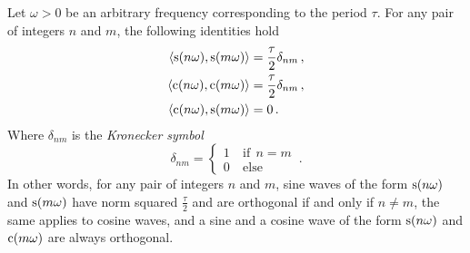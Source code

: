 \begin{theorem}
  \label{thm:sc-orth}
  Let $\omega>0$ be an arbitrary frequency corresponding to the period $\tau$. For any
  pair of integers $n$ and $m$, the following identities hold
  \begin{align}
    \braket{\operatorname{s}(n\omega),\operatorname{s}(m\omega)}&=\frac{\tau}{2}\delta_{nm}\,,\label{eq:sw-orth}\\
    \braket{\operatorname{c}(n\omega),\operatorname{c}(m\omega)}&=\frac{\tau}{2}\delta_{nm}\,,\label{eq:cw-orth}\\
    \braket{\operatorname{c}(n\omega),\operatorname{s}(m\omega)}&=0\,.\label{eq:scw-orth}
  \end{align}
  Where $\delta_{nm}$ is the \emph{Kronecker symbol}
  \begin{equation}
    \delta_{nm}=
    \begin{cases}
      1&~\mathrm{if}~~n=m\\
      0&~\mathrm{else}
    \end{cases}\,.
  \end{equation}
  In other words, for any pair of integers $n$ and $m$, sine waves of the form
  $\operatorname{s}(n\omega)$ and $\operatorname{s}(m\omega)$ have norm squared $\frac{\tau}{2}$ and are orthogonal
  if and only if $n\neq m$, the same applies to cosine waves, and a sine and a cosine wave
  of the form $\operatorname{s}(n\omega)$ and $\operatorname{c}(m\omega)$ are always orthogonal.
\end{theorem}
